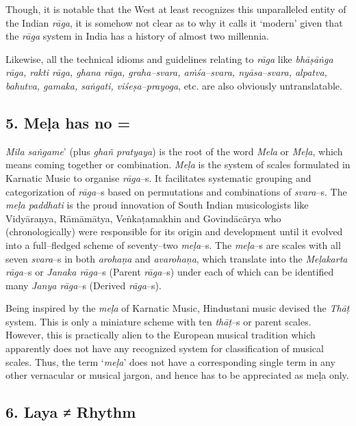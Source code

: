 Though, it is notable that the West at least recognizes this unparalleled entity of the Indian \textit{rāga}, it is somehow not clear as to why it calls it ‘modern’ given that the \textit{rāga} system in India has a history of almost two millennia.

Likewise, all the technical idioms and guidelines relating to \textit{rāga} like \textit{bhāṣāṅga rāga, rakti rāga, ghana rāga, graha–svara, aṁśa–svara, nyāsa–svara, alpatva, bahutva, gamaka, saṅgati, viśeṣa–prayoga}, etc. are also obviously untranslatable.


\subsection*{5. Meḷa has no =}

\textit{Mila saṅgame}’ (plus \textit{ghañ pratyaya}) is the root of the word \textit{Mela} or \textit{Meḷa}, which means coming together or combination. \textit{Meḷa} is the system of scales formulated in Karnatic Music to organise \textit{rāga}–s. It facilitates systematic grouping and categorization of \textit{rāga}–s based on permutations and combinations of \textit{svara}–s. The \textit{meḷa paddhati} is the proud innovation of South Indian musicologists like Vidyāraṇya, Rāmāmātya, Veṅkaṭamakhin and Govindācārya who (chronologically) were responsible for its origin and development until it evolved into a full–fledged scheme of seventy–two \textit{meḷa}–s. The \textit{meḷa}–s are scales with all seven \textit{svara}–s in both \textit{arohaṇa} and \textit{avarohaṇa}, which translate into the \textit{Meḷakarta rāga}–s or \textit{Janaka rāga}–s (Parent \textit{rāga}–s) under each of which can be identified many \textit{Janya rāga}–s (Derived \textit{rāga}–s).

Being inspired by the \textit{meḷa} of Karnatic Music, Hindustani music devised the \textit{Thāṭ} system. This is only a miniature scheme with ten \textit{thāṭ}–s or parent scales. However, this is practically alien to the European musical tradition which apparently does not have any recognized system for classification of musical scales. Thus, the term ‘\textit{meḷa}’ does not have a corresponding single term in any other vernacular or musical jargon, and hence has to be appreciated as meḷa only.


\subsection*{6. Laya ≠ Rhythm}

